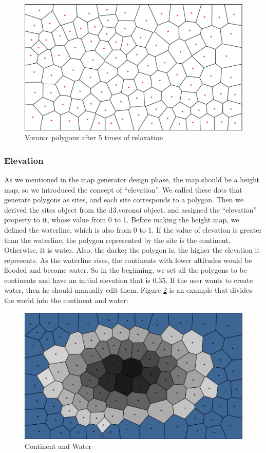 \begin{figure}[htbp]
  \includegraphics[width=\textwidth]{section04/assets/Map-voronoi-relaxation.png}
  \caption{Voronoi polygons after 5 times of relaxation}
  \label{fig:Voronoi relaxed polygons}
\end{figure}

\subsubsection{Elevation}
As we mentioned in the map generator design phase, the map should be a height map, so we introduced the concept of ``elevation''. We called these dots that generate polygons as sites, and each site corresponds to a polygon. Then we derived the sites object from the d3.voronoi object, and assigned the ``elevation'' property to it, whose value from 0 to 1. Before making the height map, we defined the waterline, which is also from 0 to 1. If the value of elevation is greater than the waterline, the polygon represented by the site is the continent. Otherwise, it is water. Also, the darker the polygon is, the higher the elevation it represents. As the waterline rises, the continents with lower altitudes would be flooded and become water. So in the beginning, we set all the polygons to be continents and have an initial elevation that is 0.35. If the user wants to create water, then he should manually edit them. Figure \ref{fig:Height Map} is an example that divides the world into the continent and water:

\begin{figure}[htbp]
  \includegraphics[width=\textwidth]{section04/assets/Map-heightmap.png}
  \caption{Continent and Water}
  \label{fig:Height Map}
\end{figure}

